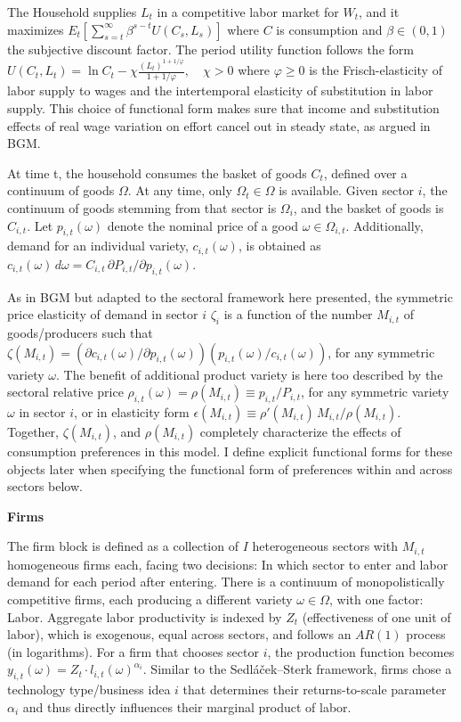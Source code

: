 \documentclass[a4paper,12pt]{article} %
\numberwithin{equation}{section} %
\numberwithin{figure}{section}
\numberwithin{table}{section}
\begin{document}
The Household supplies $L_t$ in a competitive labor market for $W_t$, and it maximizes $E_t \left[ \sum_{s=t}^{\infty} \beta^{s - t} U(C_s, L_s) \right]$ 
where $C$ is consumption and $\beta \in (0,1)$ the subjective discount factor. The period utility function follows the form 
$U(C_t, L_t) = \ln C_t - \chi \frac{(L_t)^{1 + 1/\varphi}}{1 + 1/\varphi}, \quad \chi > 0$ where $\varphi \geq 0$ is the Frisch-elasticity
of labor supply to wages and the intertemporal elasticity of substitution in labor supply. This choice of functional form makes sure that 
income and substitution effects of real wage variation on effort cancel out in steady state, as argued in BGM.

At time t, the household consumes the basket of goods $C_t$, defined over a continuum of goods $\Omega$. At any time, only $\Omega_t \in \Omega$ 
is available. Given sector $i$, the continuum of goods stemming from that sector is $\Omega_{i}$, and the basket of goods is $C_{i,t}$. 
Let $p_{i,t}(\omega)$ denote the nominal price 
of a good $\omega \in \Omega_{i,t}$. Additionally, demand for an individual variety, $c_{i,t}(\omega)$, is obtained as 
$c_{i,t}(\omega) \, d\omega = C_{i,t} \, \partial P_{i,t} / \partial p_{i,t}(\omega)$.

As in BGM but adapted to the sectoral framework here presented, the symmetric price elasticity of demand in sector $i$ $\zeta_i$  is a function 
of the number $M_{i,t}$ of goods/producers such that $\zeta (M_{i,t}) = (\partial c_{i,t}(\omega)/\partial p_{i,t}(\omega))(p_{i,t}(\omega)/c_{i,t}(\omega))$, 
for any symmetric variety $\omega$. The benefit of additional product variety is here too described by the sectoral relative price $\rho_{i,t}(\omega) =
\rho(M_{i,t}) \equiv p_{i,t}/P_{i,t}$, for any symmetric variety $\omega$ in sector $i$, or in elasticity form $\epsilon(M_{i,t}) \equiv \rho'(M_{i,t})\,M_{i,t}/\rho(M_{i,t})$. 
Together, $\zeta(M_{i,t})$, and $\rho (M_{i,t})$ completely 
characterize the effects of consumption preferences in this model. I define explicit functional forms for these objects later when specifying the 
functional form of preferences within and across sectors below.


\medskip
\medskip
\noindent\textbf{Firms}
\medskip

The firm block is defined as a collection of $I$ heterogeneous sectors with $M_{i,t}$ homogeneous firms each, 
facing two decisions: In which sector to enter and labor demand for each period after entering. There is a continuum of monopolistically competitive
firms, each producing a different variety $\omega \in \Omega$, with one factor: Labor. 
Aggregate labor productivity is indexed by $Z_t$ (effectiveness of one unit of labor), which is 
exogenous, equal across sectors, and follows an $AR(1)$ process (in logarithms). For a firm that chooses sector $i$, the production function becomes
$y_{i,t}(\omega) = Z_t \cdot l_{i,t}(\omega)^{\alpha_i}$. Similar to the Sedláček–Sterk framework, firms chose a technology type/business idea $i$ 
that determines their returns-to-scale parameter $\alpha_i$ and thus directly influences their marginal product of labor.
\end{document}
